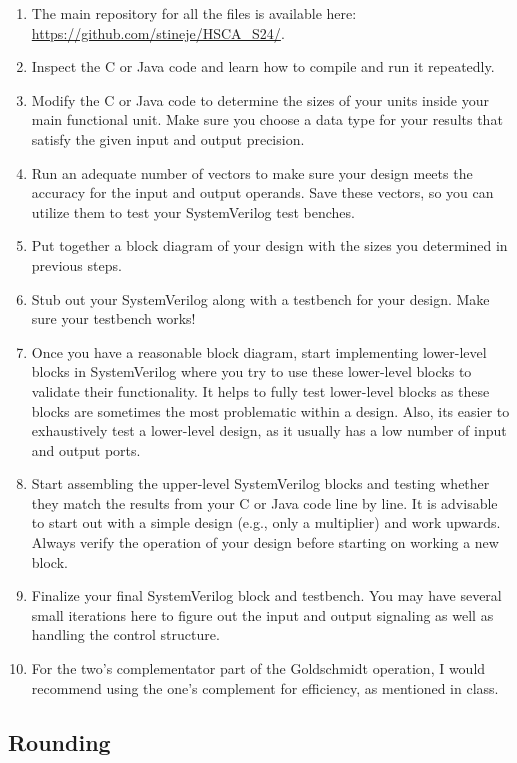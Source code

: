 \documentclass[times, 10pt, twocolumn]{IEEEtran}
\begin{document}
\begin{enumerate}
\item The main repository for all the files is available here:
  \url{https://github.com/stineje/HSCA_S24/}.    
\item Inspect the C or Java code and learn how to compile and run it
  repeatedly.
\item Modify the C or Java code to determine the sizes of your units
  inside your main functional unit.  Make sure you choose a data type
  for your results that satisfy the given input and output precision.
\item Run an adequate number of vectors to make sure your design meets the
  accuracy for the input and output operands.  Save these vectors, so
  you can utilize them to test your SystemVerilog test
  benches.  
\item Put together a block diagram of your design with the sizes you
  determined in previous steps.
\item Stub out your SystemVerilog along with a testbench for your
  design.  Make sure your testbench works!
\item Once you have a reasonable block diagram, start implementing
  lower-level blocks in SystemVerilog where you try to use
  these lower-level blocks to validate their functionality.  It helps
  to fully test lower-level blocks as these blocks are
  sometimes the most problematic within a design.  Also, its easier to
  exhaustively test a lower-level design, as it usually has a low
  number of input and output ports.
\item Start assembling the upper-level SystemVerilog 
  blocks and testing whether they match the results from your C or
  Java code line by line.  
  It is advisable to start out with a simple design (e.g.,
  only a multiplier) and work upwards.  Always verify the operation of
  your design before starting on working a new block.
\item Finalize your final SystemVerilog block and testbench.  You may
  have several small iterations here to figure out the input and
  output signaling as well as handling the control structure.
\item For the two's complementator part of the Goldschmidt operation, I would
  recommend using the one's complement for efficiency,
  as mentioned in class.
\end{enumerate}

\subsection{Rounding}
\end{document}
